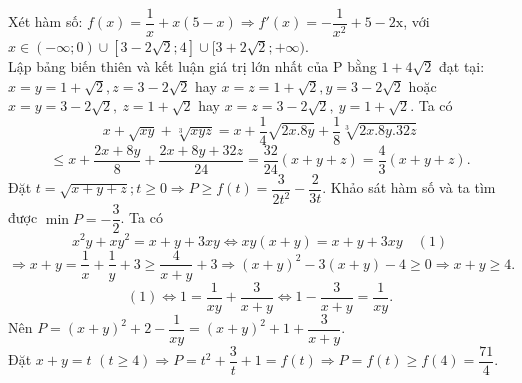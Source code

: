 Xét hàm số: $f\left( x \right)=\dfrac{1}{x}+x\left( 5-x \right)\Rightarrow f'\left( x \right)=-\dfrac{1}{{{x}^{2}}}+5-2\text{x}$, với $x\in(-\infty;0)\cup[3-2\sqrt{2};4]\cup[3+2\sqrt{2};+\infty)$.\\
Lập bảng biến thiên và kết luận giá trị lớn nhất của P bằng $1+4\sqrt{2}$ đạt tại: $x=y=1+\sqrt{2},z=3-2\sqrt{2}$ hay $x=z=1+\sqrt{2},y=3-2\sqrt{2}$ hoặc  $x=y=3-2\sqrt{2},\ z=1+\sqrt{2}$ hay $ x=z=3-2\sqrt{2},\ y=1+\sqrt{2}$.
\hda  Ta có $$x+\sqrt{xy}+\sqrt[3]{xyz}=x+\frac{1}{4}\sqrt{2x.8y}+\frac{1}{8}\sqrt[3]{2x.8y.32z}$$
$$\le x+\frac{2x+8y}{8}+\frac{2x+8y+32z}{24}=\frac{32}{24}\left( x+y+z \right)=\frac{4}{3}\left( x+y+z \right).$$
Đặt $t=\sqrt{x+y+z};t\ge 0\Rightarrow P\ge f\left( t \right)=\dfrac{3}{2{{t}^{2}}}-\dfrac{2}{3t}$. Khảo sát hàm số và ta tìm được $\min P=-\dfrac{3}{2}$.
\hda  Ta có 
$${{x}^{2}}y+x{{y}^{2}}=x+y+3xy\Leftrightarrow xy(x+y)=x+y+3xy\quad (1)$$
$$\Rightarrow x+y=\frac{1}{x}+\frac{1}{y}+3\ge \frac{4}{x+y}+3\Rightarrow {{(x+y)}^{2}}-3(x+y)-4\ge 0\Rightarrow x+y\ge 4.$$
$$(1)\Leftrightarrow 1=\frac{1}{xy}+\frac{3}{x+y}\Leftrightarrow 1-\frac{3}{x+y}=\frac{1}{xy}.$$
Nên $P={{(x+y)}^{2}}+2-\dfrac{1}{xy}={{(x+y)}^{2}}+1+\dfrac{3}{x+y}$.\\
Đặt $x+y=t\,\,(t\ge 4)\Rightarrow P={{t}^{2}}+\dfrac{3}{t}+1=f(t)\Rightarrow P=f(t)\ge f(4)=\dfrac{71}{4}$.

